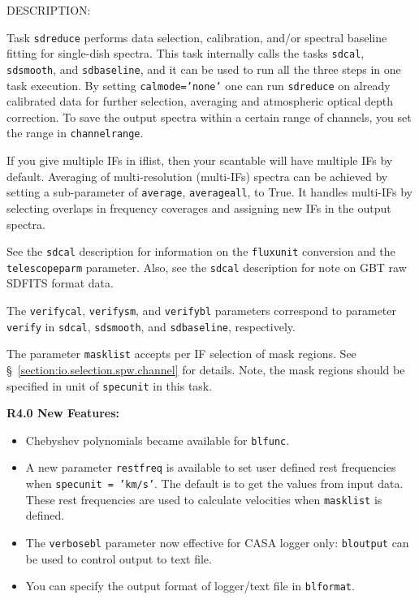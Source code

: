 DESCRIPTION:

Task {\tt sdreduce} performs data selection, calibration, and/or spectral
baseline fitting for single-dish spectra. This task internally calls the
tasks {\tt sdcal}, {\tt sdsmooth}, and {\tt sdbaseline}, and it can be used to run all the
three steps in one task execution.
By setting {\tt calmode='none'}
one can run {\tt sdreduce} on already calibrated data for further selection, averaging and atmospheric optical depth correction. 
To save the output spectra within a certain range of 
channels, you set the range in {\tt channelrange}. 

If you give multiple IFs in iflist, then your scantable will have
multiple IFs by default. Averaging of multi-resolution (multi-IFs)
spectra can be achieved by setting a sub-parameter of {\tt average}, 
{\tt averageall}, to True. It handles multi-IFs by selecting overlaps in 
frequency coverages and assigning new IFs in the output spectra.

See the {\tt sdcal} description for information on the {\tt fluxunit} 
conversion and the {\tt telescopeparm} parameter.
Also, see the {\tt sdcal} description for note on GBT raw SDFITS format data.

The {\tt verifycal}, {\tt verifysm}, and {\tt verifybl}  parameters correspond to parameter
{\tt  verify} in {\tt sdcal}, {\tt sdsmooth}, and {\tt sdbaseline}, respectively. 
    

The parameter {\tt masklist} accepts per IF selection of mask regions. 
See \S~\ref{section:io.selection.spw.channel} for details. 
Note, the mask regions should be specified in unit of {\tt specunit} 
in this task.

\medskip
{\bf R4.0 New Features:}\\
\begin{itemize}
\item Chebyshev polynomials became available for {\tt blfunc}. 
\item A new parameter {\tt restfreq} is available to set user defined
  rest frequencies when {\tt specunit = 'km/s'}. The default is to get
  the values from input data.
  These rest frequencies are used to calculate velocities when 
  {\tt masklist} is defined.
\item The {\tt verbosebl} parameter now effective for CASA logger only: 
{\tt bloutput} can be used to control output to text file. 
\item You can specify the output format of logger/text file in {\tt blformat}. 
\end{itemize}

